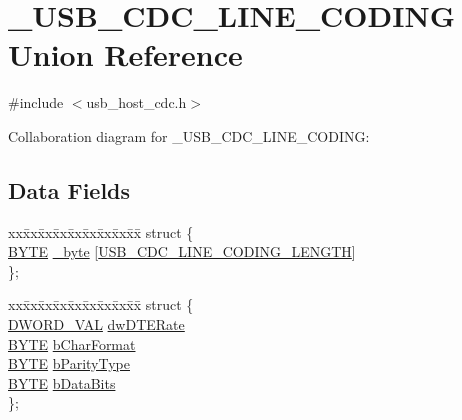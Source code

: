 \hypertarget{union___u_s_b___c_d_c___l_i_n_e___c_o_d_i_n_g}{}\section{\+\_\+\+U\+S\+B\+\_\+\+C\+D\+C\+\_\+\+L\+I\+N\+E\+\_\+\+C\+O\+D\+I\+N\+G Union Reference}
\label{union___u_s_b___c_d_c___l_i_n_e___c_o_d_i_n_g}


{\ttfamily \#include $<$usb\+\_\+host\+\_\+cdc.\+h$>$}



Collaboration diagram for \+\_\+\+U\+S\+B\+\_\+\+C\+D\+C\+\_\+\+L\+I\+N\+E\+\_\+\+C\+O\+D\+I\+N\+G\+:
\subsection*{Data Fields}
\begin{DoxyCompactItemize}
\item 
\begin{tabbing}
xx\=xx\=xx\=xx\=xx\=xx\=xx\=xx\=xx\=\kill
struct \{\\
\>\hyperlink{_generic_type_defs_8h_a4ae1dab0fb4b072a66584546209e7d58}{BYTE} \hyperlink{union___u_s_b___c_d_c___l_i_n_e___c_o_d_i_n_g_a5f30077f01d59764c545d489904b43ba}{\_byte} \mbox{[}\hyperlink{usb__host__cdc_8h_a0f27684bdce01a4eb5f30743673d07c4}{USB\_CDC\_LINE\_CODING\_LENGTH}\mbox{]}\\
\}; \\

\end{tabbing}\item 
\begin{tabbing}
xx\=xx\=xx\=xx\=xx\=xx\=xx\=xx\=xx\=\kill
struct \{\\
\>\hyperlink{union_d_w_o_r_d___v_a_l}{DWORD\_VAL} \hyperlink{union___u_s_b___c_d_c___l_i_n_e___c_o_d_i_n_g_a3f19594f07e3ee40f13461244d422caa}{dwDTERate}\\
\>\hyperlink{_generic_type_defs_8h_a4ae1dab0fb4b072a66584546209e7d58}{BYTE} \hyperlink{union___u_s_b___c_d_c___l_i_n_e___c_o_d_i_n_g_a946f73bf80c1a1df593f506d5381c22f}{bCharFormat}\\
\>\hyperlink{_generic_type_defs_8h_a4ae1dab0fb4b072a66584546209e7d58}{BYTE} \hyperlink{union___u_s_b___c_d_c___l_i_n_e___c_o_d_i_n_g_a264c2ee2e2f600d79638ef4c50dd8954}{bParityType}\\
\>\hyperlink{_generic_type_defs_8h_a4ae1dab0fb4b072a66584546209e7d58}{BYTE} \hyperlink{union___u_s_b___c_d_c___l_i_n_e___c_o_d_i_n_g_a302d162c7ae97d941879129a8be0ad95}{bDataBits}\\
\}; \\

\end{tabbing}\end{DoxyCompactItemize}


